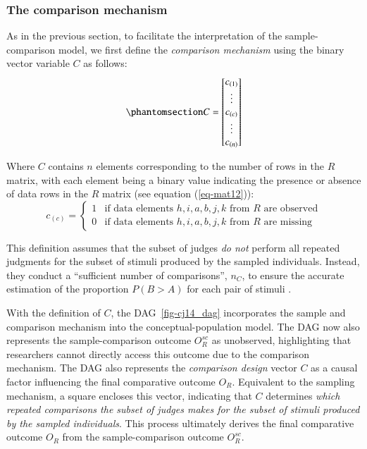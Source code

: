 \documentclass[
  authoryear,
  review,
  1p]{elsarticle}
\begin{document}
\subsubsection{The comparison
mechanism}\label{sec-theory-theoretical_SC2}

As in the previous section, to facilitate the interpretation of the
sample-comparison model, we first define the \emph{comparison mechanism}
using the binary vector variable \(C\) as follows:
\begin{equation}\phantomsection\label{eq-mat26}{
C = \begin{bmatrix}
c_{(1)} \\
\vdots \\
c_{(c)} \\
\vdots \\
c_{(n)} \\
\end{bmatrix}
}\end{equation}

Where \(C\) contains \(n\) elements corresponding to the number of rows
in the \(R\) matrix, with each element being a binary value indicating
the presence or absence of data rows in the \(R\) matrix (see equation
(\ref{eq-mat12})): \[
c_{(c)} = \begin{cases} 
1 & \text{if data elements } h, i, a, b, j, k \text{ from } R \text{ are observed} \\
0 & \text{if data elements } h, i, a, b, j, k \text{ from } R \text{ are missing}
\end{cases}
\]

This definition assumes that the subset of judges \emph{do not} perform
all repeated judgments for the subset of stimuli produced by the sampled
individuals. Instead, they conduct a ``sufficient number of
comparisons'', \(n_{C}\), to ensure the accurate estimation of the
proportion \(P(B>A)\) for each pair of stimuli
\citep[pp.~267]{Thurstone_1927b}.

With the definition of \(C\), the DAG~\ref{fig-cj14_dag} incorporates
the sample and comparison mechanism into the conceptual-population
model. The DAG now also represents the sample-comparison outcome
\(O^{sc}_{R}\) as unobserved, highlighting that researchers cannot
directly access this outcome due to the comparison mechanism. The DAG
also represents the \emph{comparison design} vector \(C\) as a causal
factor influencing the final comparative outcome \(O_{R}\). Equivalent
to the sampling mechanism, a square encloses this vector, indicating
that \(C\) determines \emph{which repeated comparisons the subset of
judges makes for the subset of stimuli produced by the sampled
individuals}. This process ultimately derives the final comparative
outcome \(O_{R}\) from the sample-comparison outcome \(O^{sc}_{R}\).
\end{document}
